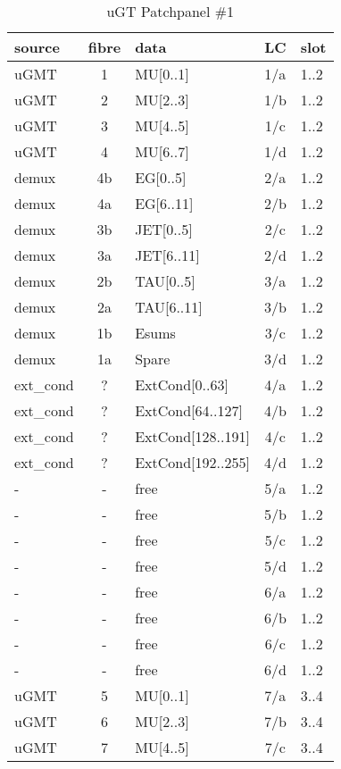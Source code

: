 \begin{longtable}{|l|c|l|c|l|}
\caption{uGT Patchpanel \#1}
    \label{tab:app:ugt_opt_pp_1}\\
\hline
\textbf{source}& \textbf{fibre}& \textbf{data}& \textbf{LC}& \textbf{slot}\\
\hline
\hline
\endhead
uGMT  & 1   & MU[0..1]   & 1/a  & 1..2 \\\hline
uGMT  & 2   & MU[2..3]   & 1/b  & 1..2 \\\hline
uGMT  & 3   & MU[4..5]   & 1/c  & 1..2 \\\hline
uGMT  & 4   & MU[6..7]   & 1/d  & 1..2 \\\hline
demux & 4b  & EG[0..5]   & 2/a  & 1..2 \\\hline
demux & 4a  & EG[6..11]  & 2/b  & 1..2 \\\hline
demux & 3b  & JET[0..5]  & 2/c  & 1..2 \\\hline
demux & 3a  & JET[6..11] & 2/d  & 1..2 \\\hline
demux & 2b  & TAU[0..5]  & 3/a  & 1..2 \\\hline
demux & 2a  & TAU[6..11] & 3/b  & 1..2 \\\hline
demux & 1b  & Esums      & 3/c  & 1..2 \\\hline
demux & 1a  & Spare      & 3/d  & 1..2 \\\hline
ext\_cond & ?   & ExtCond[0..63]    & 4/a  & 1..2 \\\hline
ext\_cond & ?   & ExtCond[64..127]  & 4/b  & 1..2 \\\hline
ext\_cond & ?   & ExtCond[128..191] & 4/c  & 1..2 \\\hline
ext\_cond & ?   & ExtCond[192..255] & 4/d  & 1..2 \\\hline
- & - & free & 5/a  & 1..2 \\\hline
- & - & free & 5/b  & 1..2 \\\hline
- & - & free & 5/c  & 1..2 \\\hline
- & - & free & 5/d  & 1..2 \\\hline
- & - & free & 6/a  & 1..2 \\\hline
- & - & free & 6/b  & 1..2 \\\hline
- & - & free & 6/c  & 1..2 \\\hline
- & - & free & 6/d  & 1..2 \\\hline
\hline
uGMT  & 5   & MU[0..1]   & 7/a  & 3..4 \\\hline
uGMT  & 6   & MU[2..3]   & 7/b  & 3..4 \\\hline
uGMT  & 7   & MU[4..5]   & 7/c  & 3..4 \\\hline

\end{longtable}
